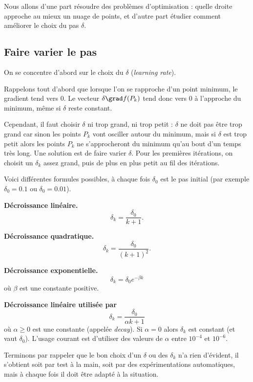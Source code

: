 \documentclass[11pt,class=report,crop=false]{standalone}
\begin{document}
Nous allons d'une part résoudre des problèmes d'optimisation : quelle droite approche au mieux un nuage de points, et d'autre part étudier comment améliorer le choix du pas $\delta$.


\subsection{Faire varier le pas}

On se concentre d'abord sur le choix du  $\delta$ (\emph{learning rate}).

Rappelons tout d'abord que lorsque l'on se rapproche d'un point minimum, le gradient tend vers $0$. Le vecteur $\delta \grad f(P_k)$ tend donc vers $0$ à l'approche du minimum, même si $\delta$ reste constant.

Cependant, il faut choisir $\delta$ ni trop grand, ni trop petit : $\delta$ ne doit pas être trop grand car sinon les points $P_k$ vont osciller autour du minimum, mais si $\delta$ est trop petit alors les points $P_k$ ne s'approcheront du minimum qu'au bout d'un temps très long. Une solution est de faire varier $\delta$. Pour les premières itérations, on choisit un $\delta_k$ assez grand, puis de plus en plus petit au fil des itérations.

Voici différentes formules possibles, à chaque fois $\delta_0$ est le pas initial (par exemple $\delta_0=0.1$ ou $\delta_0=0.01$).

\textbf{Décroissance linéaire.}
$$\delta_k = \frac{\delta_0}{k+1}.$$

\textbf{Décroissance quadratique.}
$$\delta_k = \frac{\delta_0}{(k+1)^2}.$$

\textbf{Décroissance exponentielle.}
$$\delta_k = \delta_0 e^{-\beta k}$$
où $\beta$ est une constante positive.


\textbf{Décroissance linéaire utilisée par \keras}
$$\delta_k = \frac{\delta_0}{\alpha k+1}$$
où $\alpha\ge0$ est une constante (appelée \emph{decay}).
Si $\alpha=0$ alors $\delta_k$ est constant (et vaut $\delta_0$).
L'usage courant est d'utiliser des valeurs de $\alpha$ entre $10^{-4}$ et $10^{-6}$.


Terminons par rappeler que le bon choix d'un $\delta$ ou des $\delta_k$ n'a rien d'évident, il s'obtient soit par test à la main, soit par des expérimentations automatiques, mais à chaque fois il doit être adapté à la situation.
\end{document}
